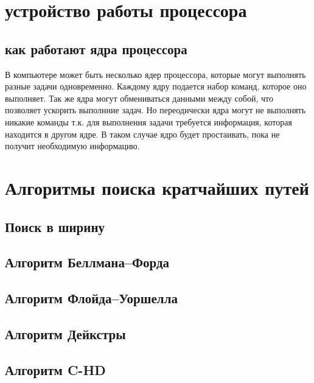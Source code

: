 \documentclass[14pt,a4paper]{extarticle}
\begin{document}
\newpage

\section{устройство работы процессора}

\subsection{как работают ядра процессора}
В компьютере может быть несколько ядер процессора, которые могут выполнять
разные задачи одновременно. Каждому ядру подается набор команд, которое
оно выполняет. Так же ядра могут обмениваться данными между собой, что позволяет
ускорить выполнние задач. Но переодически ядра могут не выполнять никакие
команды т.к. для выполнения задачи требуется информация, которая находится в
другом ядре. В таком случае ядро будет простаивать, пока не получит необходимую
информацию. 
\section{Алгоритмы поиска кратчайших путей}

\subsection{Поиск в ширину}


\subsection{Алгоритм Беллмана--Форда}

\subsection{Алгоритм Флойда--Уоршелла}


\subsection{Алгоритм Дейкстры}

\subsection{Алгоритм C-HD}
\end{document}
